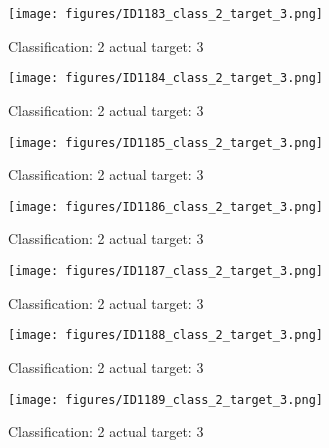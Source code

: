 \begin{figure}[h!]
\begin{center}
\texttt{[image: figures/ID1183\_class\_2\_target\_3.png]}
\end{center}
\caption{ Classification: 2 actual target: 3}
\label{fig:ID1183_class_2_target_3}
\end{figure}
\begin{figure}[h!]
\begin{center}
\texttt{[image: figures/ID1184\_class\_2\_target\_3.png]}
\end{center}
\caption{ Classification: 2 actual target: 3}
\label{fig:ID1184_class_2_target_3}
\end{figure}
\begin{figure}[h!]
\begin{center}
\texttt{[image: figures/ID1185\_class\_2\_target\_3.png]}
\end{center}
\caption{ Classification: 2 actual target: 3}
\label{fig:ID1185_class_2_target_3}
\end{figure}
\begin{figure}[h!]
\begin{center}
\texttt{[image: figures/ID1186\_class\_2\_target\_3.png]}
\end{center}
\caption{ Classification: 2 actual target: 3}
\label{fig:ID1186_class_2_target_3}
\end{figure}
\begin{figure}[h!]
\begin{center}
\texttt{[image: figures/ID1187\_class\_2\_target\_3.png]}
\end{center}
\caption{ Classification: 2 actual target: 3}
\label{fig:ID1187_class_2_target_3}
\end{figure}
\begin{figure}[h!]
\begin{center}
\texttt{[image: figures/ID1188\_class\_2\_target\_3.png]}
\end{center}
\caption{ Classification: 2 actual target: 3}
\label{fig:ID1188_class_2_target_3}
\end{figure}
\begin{figure}[h!]
\begin{center}
\texttt{[image: figures/ID1189\_class\_2\_target\_3.png]}
\end{center}
\caption{ Classification: 2 actual target: 3}
\label{fig:ID1189_class_2_target_3}
\end{figure}
